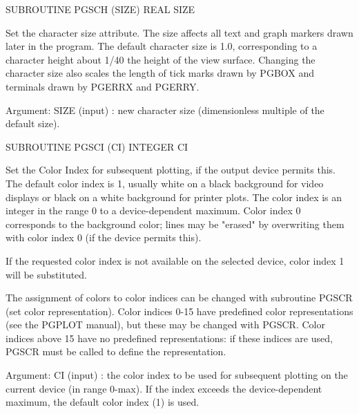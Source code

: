 {\eightpoint\begintt
      SUBROUTINE PGSCH (SIZE)
      REAL SIZE
 
Set the character size attribute. The size affects all text and graph
markers drawn later in the program. The default character size is
1.0, corresponding to a character height about 1/40 the height of
the view surface.  Changing the character size also scales the length
of tick marks drawn by PGBOX and terminals drawn by PGERRX and PGERRY.
 
Argument:
 SIZE   (input)  : new character size (dimensionless multiple of
                   the default size).
\endtt}

{\eightpoint\begintt
      SUBROUTINE PGSCI (CI)
      INTEGER  CI
 
Set the Color Index for subsequent plotting, if the output device
permits this. The default color index is 1, usually white on a black
background for video displays or black on a white background for
printer plots. The color index is an integer in the range 0 to a
device-dependent maximum. Color index 0 corresponds to the background
color; lines may be "erased" by overwriting them with color index 0
(if the device permits this).
 
If the requested color index is not available on the selected device,
color index 1 will be substituted.
 
The assignment of colors to color indices can be changed with
subroutine PGSCR (set color representation).  Color indices 0-15
have predefined color representations (see the PGPLOT manual), but
these may be changed with PGSCR.  Color indices above 15  have no
predefined representations: if these indices are used, PGSCR must
be called to define the representation.
 
Argument:
 CI     (input)  : the color index to be used for subsequent plotting
                   on the current device (in range 0-max). If the
                   index exceeds the device-dependent maximum, the
                   default color index (1) is used.
\endtt}


